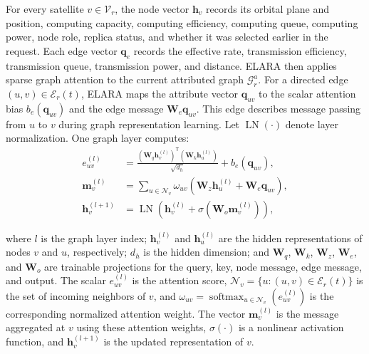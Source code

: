 \documentclass[10pt, conference, letterpaper]{IEEEtran}
\begin{document}
For every satellite $v\in\mathcal V_r$, the node vector $\mathbf{h}_v$ records its orbital plane and position, computing capacity, computing efficiency, computing queue, computing power, node role, replica status, and whether it was selected earlier in the request. Each edge vector $\mathbf{q}_{e}$ records the effective rate, transmission efficiency, transmission queue, transmission power, and distance.
ELARA then applies sparse graph attention to the current attributed graph $\mathcal{G}^a_r$. 
For a directed edge $(u,v)\in \mathcal E_r(t)$, ELARA maps the attribute vector $\mathbf q_{uv}$ to the scalar attention bias $b_e(\mathbf q_{uv})$ and the edge message $\mathbf W_e\mathbf q_{uv}$. This edge describes message passing from $u$ to $v$ during graph representation learning. Let $\operatorname{LN}(\cdot)$ denote layer normalization. One graph layer computes:
\begin{align}
e_{uv}^{(l)}&=\frac{(\mathbf W_q\mathbf h_v^{(l)})^{\mathsf T}
(\mathbf W_k\mathbf h_u^{(l)})}{\sqrt{d_h}}+b_e(\mathbf q_{uv}),\nonumber\\
\mathbf m_v^{(l)}&=\sum_{u\in\mathcal N_v}\omega_{uv}
(\mathbf W_z\mathbf h_u^{(l)}+\mathbf W_e\mathbf q_{uv}),\nonumber\\
\mathbf h_v^{(l+1)}&=\operatorname{LN}\!\left(
\mathbf h_v^{(l)}+\sigma(\mathbf W_o\mathbf m_v^{(l)})\right),
\label{eq:sparse_graph_attention}
\end{align}

where $l$ is the graph layer index; $\mathbf h_v^{(l)}$ and $\mathbf h_u^{(l)}$ are the hidden representations of nodes $v$ and $u$, respectively; $d_h$ is the hidden dimension; and $\mathbf W_q$, $\mathbf W_k$, $\mathbf W_z$, $\mathbf W_e$, and $\mathbf W_o$ are trainable projections for the query, key, node message, edge message, and output. The scalar $e_{uv}^{(l)}$ is the attention score, $\mathcal N_v=\{u:(u,v)\in\mathcal E_r(t)\}$ is the set of incoming neighbors of $v$, and $\omega_{uv}=\operatorname{softmax}_{u\in\mathcal N_v}(e_{uv}^{(l)})$ is the corresponding normalized attention weight. The vector $\mathbf m_v^{(l)}$ is the message aggregated at $v$ using these attention weights, $\sigma(\cdot)$ is a nonlinear activation function, and $\mathbf h_v^{(l+1)}$ is the updated representation of $v$.
\end{document}
